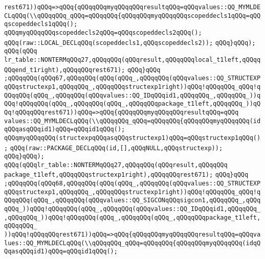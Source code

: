 \verb|rest671))qQQq=>qQQq{qQQqqQQqmyqQQqqQQqresultqQQq=qQQqvalues::QQ_MYMLDECLqQQq(\\qQQqqQQq_qQQq=qQQqqQQq{qQQqqQQqmyqQQqqQQqscopeddecls1qQQq=qQQqscopeddecls1qQQq();|\newline
\verb|qQQqmyqQQqqQQqscopeddecls2qQQq=qQQqscopeddecls2qQQq();|\newline
\verb|qQQq(raw::LOCAL_DECLqQQq(scopeddecls1,qQQqscopeddecls2));|\newline
\verb|qQQq}qQQq);|\newline
\verb|qQQq(qQQq|\newline
\verb|lr_table::NONTERMqQQq27,qQQqqQQq(qQQqresult,qQQqqQQqlocal_t1left,qQQqqQQqend_t1right),qQQqqQQqrest671);|\newline
\verb|qQQq}qQQq|\newline
\verb|;qQQqqQQq(qQQq67,qQQqqQQq(qQQq(qQQq_,qQQqqQQq(qQQqvalues::QQ_STRUCTEXPqQQqstructexp1,qQQqqQQq_,qQQqqQQqstructexp1right))qQQq!qQQqqQQq_qQQq!qQQqqQQq(qQQq_,qQQqqQQq(qQQqvalues::QQ_IDqQQqid1,qQQqqQQq_,qQQqqQQq_))qQQq!qQQqqQQq(qQQq_,qQQqqQQq(qQQq_,qQQqqQQqpackage_t1left,qQQqqQQq_))qQQq!qQQqqQQqrest671))qQQq=>qQQq{qQQqqQQqmyqQQqqQQqresultqQQq=qQQq|\newline
\verb|values::QQ_MYMLDECLqQQq(\\qQQqqQQq_qQQq=qQQqqQQq{qQQqqQQqmyqQQqqQQq(idqQQqasqQQqid1)qQQq=qQQqid1qQQq();|\newline
\verb|qQQqmyqQQqqQQq(structexpqQQqasqQQqstructexp1)qQQq=qQQqstructexp1qQQq();|\newline
\verb|qQQq(raw::PACKAGE_DECLqQQq(id,[],qQQqNULL,qQQqstructexp));|\newline
\verb|qQQq}qQQq);|\newline
\verb|qQQq(qQQqlr_table::NONTERMqQQq27,qQQqqQQq(qQQqresult,qQQqqQQq|\newline
\verb|package_t1left,qQQqqQQqstructexp1right),qQQqqQQqrest671);|\newline
\verb|qQQq}qQQq|\newline
\verb|;qQQqqQQq(qQQq68,qQQqqQQq(qQQq(qQQq_,qQQqqQQq(qQQqvalues::QQ_STRUCTEXPqQQqstructexp1,qQQqqQQq_,qQQqqQQqstructexp1right))qQQq!qQQqqQQq_qQQq!qQQqqQQq(qQQq_,qQQqqQQq(qQQqvalues::QQ_SIGCONqQQqsigcon1,qQQqqQQq_,qQQqqQQq_))qQQq!qQQqqQQq(qQQq_,qQQqqQQq(qQQqvalues::QQ_IDqQQqid1,qQQqqQQq_,qQQqqQQq_))qQQq!qQQqqQQq(qQQq_,qQQqqQQq(qQQq_,qQQqqQQqpackage_t1left,qQQqqQQq_|\newline
\verb|))qQQq!qQQqqQQqrest671))qQQq=>qQQq{qQQqqQQqmyqQQqqQQqresultqQQq=qQQqvalues::QQ_MYMLDECLqQQq(\\qQQqqQQq_qQQq=qQQqqQQq{qQQqqQQqmyqQQqqQQq(idqQQqasqQQqid1)qQQq=qQQqid1qQQq();|\newline
